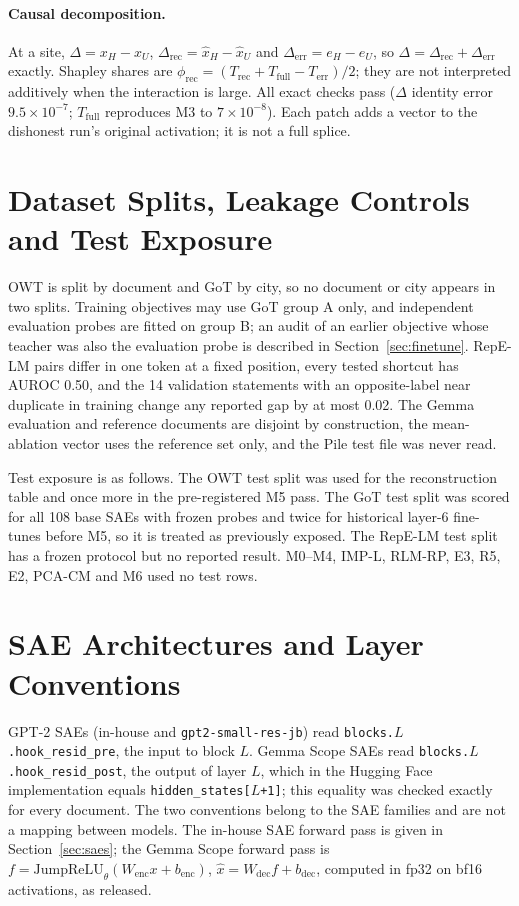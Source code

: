 \paragraph{Causal decomposition.} At a site, $\Delta=x_H-x_U$, $\Delta_{\text{rec}}=\hat{x}_H-\hat{x}_U$ and
$\Delta_{\text{err}}=e_H-e_U$, so $\Delta=\Delta_{\text{rec}}+\Delta_{\text{err}}$ exactly. Shapley shares are
$\phi_{\text{rec}}=(T_{\text{rec}}+T_{\text{full}}-T_{\text{err}})/2$; they are not interpreted additively when the
interaction is large. All exact checks pass ($\Delta$ identity error $9.5\times10^{-7}$; $T_{\text{full}}$ reproduces
M3 to $7\times10^{-8}$). Each patch adds a vector to the dishonest run's original activation; it is not a full splice.

\section{Dataset Splits, Leakage Controls and Test Exposure}\label{app:exposure}

OWT is split by document and GoT by city, so no document or city appears in two splits. Training objectives may use GoT
group A only, and independent evaluation probes are fitted on group B; an audit of an earlier objective whose teacher
was also the evaluation probe is described in Section~\ref{sec:finetune}. RepE-LM pairs differ in one token at a fixed
position, every tested shortcut has AUROC 0.50, and the 14 validation statements with an opposite-label near duplicate in
training change any reported gap by at most 0.02. The Gemma evaluation and reference documents are disjoint by
construction, the mean-ablation vector uses the reference set only, and the Pile test file was never read.

Test exposure is as follows. The OWT test split was used for the reconstruction table and once more in the
pre-registered M5 pass. The GoT test split was scored for all 108 base SAEs with frozen probes and twice for historical
layer-6 fine-tunes before M5, so it is treated as previously exposed. The RepE-LM test split has a frozen protocol but
no reported result. M0--M4, IMP-L, RLM-RP, E3, R5, E2, PCA-CM and M6 used no test rows.

\section{SAE Architectures and Layer Conventions}\label{app:arch}

GPT-2 SAEs (in-house and \texttt{gpt2-small-res-jb}) read \texttt{blocks.$L$.hook\_resid\_pre}, the input to block $L$.
Gemma Scope SAEs read \texttt{blocks.$L$.hook\_resid\_post}, the output of layer $L$, which in the Hugging Face
implementation equals \texttt{hidden\_states[$L$+1]}; this equality was checked exactly for every document. The two
conventions belong to the SAE families and are not a mapping between models. The in-house SAE forward pass is given in
Section~\ref{sec:saes}; the Gemma Scope forward pass is
$f=\mathrm{JumpReLU}_\theta(W_{\text{enc}}x+b_{\text{enc}})$, $\hat{x}=W_{\text{dec}}f+b_{\text{dec}}$, computed in fp32 on bf16
activations, as released.


